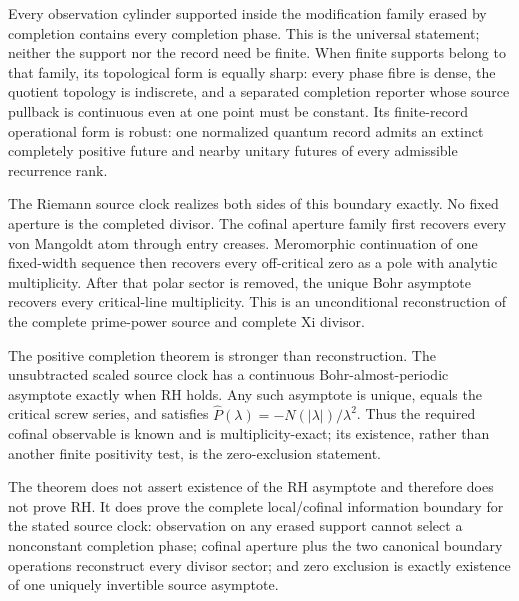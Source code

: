 \documentclass[11pt]{article}
\theoremstyle{definition}
\theoremstyle{remark}
\begin{document}
Every observation cylinder supported inside the modification family erased by completion contains
every completion phase.  This is the universal statement; neither the support nor the record need
be finite.  When finite supports belong to that family, its topological form is equally sharp:
every phase fibre is dense, the quotient topology is indiscrete, and a separated completion
reporter whose source pullback is continuous even at one point must be constant.  Its finite-record
operational form is robust: one normalized quantum record admits an extinct completely positive
future and nearby unitary futures of every admissible recurrence rank.

The Riemann source clock realizes both sides of this boundary exactly.  No fixed aperture is the
completed divisor.  The cofinal aperture family first recovers every von Mangoldt atom through
entry creases.  Meromorphic continuation of one fixed-width sequence then recovers every
off-critical zero as a pole with analytic multiplicity.  After that polar sector is removed, the
unique Bohr asymptote recovers every critical-line multiplicity.  This is an unconditional
reconstruction of the complete prime-power source and complete Xi divisor.

The positive completion theorem is stronger than reconstruction.  The unsubtracted scaled source
clock has a continuous Bohr-almost-periodic asymptote exactly when RH holds.  Any such asymptote is
unique, equals the critical screw series, and satisfies
\(\widehat P(\lambda)=-N(|\lambda|)/\lambda^2\).  Thus the required cofinal observable is known
and is multiplicity-exact; its existence, rather than another finite positivity test, is the
zero-exclusion statement.

The theorem does not assert existence of the RH asymptote and therefore does not prove RH.  It
does prove the complete local/cofinal information boundary for the stated source clock: observation
on any erased support cannot select a nonconstant completion phase; cofinal aperture plus the two
canonical boundary operations reconstruct every divisor sector; and zero exclusion is exactly
existence of one uniquely invertible source asymptote.
\end{document}
